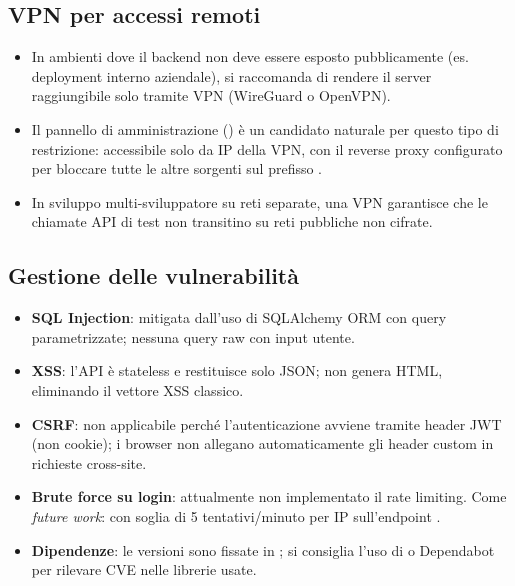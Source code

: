 \subsection{VPN per accessi remoti}
\begin{itemize}
    \item In ambienti dove il backend non deve essere esposto pubblicamente
    (es. deployment interno aziendale), si raccomanda di rendere il server
    raggiungibile solo tramite VPN (WireGuard o OpenVPN).
    \item Il pannello di amministrazione () è un candidato
    naturale per questo tipo di restrizione: accessibile solo da IP della
    VPN, con il reverse proxy configurato per bloccare tutte le altre
    sorgenti sul prefisso .
    \item In sviluppo multi-sviluppatore su reti separate, una VPN garantisce
    che le chiamate API di test non transitino su reti pubbliche non cifrate.
\end{itemize}

\subsection{Gestione delle vulnerabilità}
\begin{itemize}
    \item \textbf{SQL Injection}: mitigata dall'uso di SQLAlchemy ORM con
    query parametrizzate; nessuna query raw con input utente.
    \item \textbf{XSS}: l'API è stateless e restituisce solo JSON; non
    genera HTML, eliminando il vettore XSS classico.
    \item \textbf{CSRF}: non applicabile perché l'autenticazione avviene
    tramite header JWT (non cookie); i browser non allegano automaticamente
    gli header custom in richieste cross-site.
    \item \textbf{Brute force su login}: attualmente non implementato il
    rate limiting. Come \emph{future work}:  con soglia
    di 5 tentativi/minuto per IP sull'endpoint .
    \item \textbf{Dipendenze}: le versioni sono fissate in
    ; si consiglia l'uso di  o
    Dependabot per rilevare CVE nelle librerie usate.
\end{itemize}

